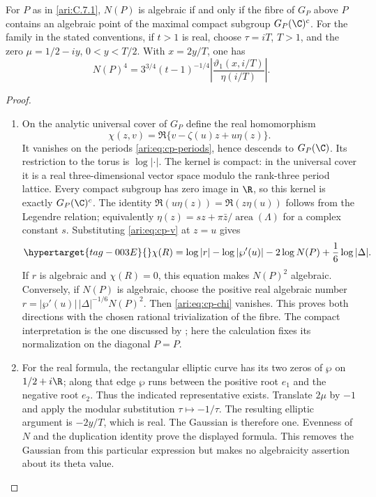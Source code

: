 \begin{proposition}\hypertarget{tag-001B}{}\label{ari:C.7.2}

For $P$ as in \cref{ari:C.7.1}, $N(P)$ is algebraic if and only
if the fibre of $G_P$ above $P$ contains an algebraic point of
the maximal compact subgroup $G_P(\C)^c$.
For the family in the stated conventions, if $t>1$ is real, choose
$\tau=iT$, $T>1$, and the zero $\mu=1/2-iy$, $0<y<T/2$.
With $x=2y/T$, one has
\[
 N(P)^4=3^{3/4}(t-1)^{-1/4}
       \left|\frac{\vartheta_1(x,i/T)}{\eta(i/T)}\right|.
\]
\end{proposition}


\begin{proof}
\begin{enumerate}[label=\arabic*.,leftmargin=*]
\item On the analytic universal cover of $G_P$ define the real
homomorphism
\[
 \chi(z,v)=\Re\{v-\zeta(u)z+u\eta(z)\}.
\]
It vanishes on the periods \eqref{ari:eq:cp-periods}, hence descends
to $G_P(\C)$. Its restriction to the torus is $\log|\cdot|$.
The kernel is compact: in the universal cover it is a real
three-dimensional vector space modulo the rank-three period
lattice. Every compact subgroup has zero image in $\R$, so
this kernel is exactly $G_P(\C)^c$.
The identity
$\Re(u\eta(z))=\Re(z\eta(u))$ follows from the Legendre relation;
equivalently $\eta(z)=sz+\pi\bar z/\operatorname{area}(\Lambda)$
for a complex constant $s$. Substituting
\eqref{ari:eq:cp-v} at $z=u$ gives
\begin{equation}\hypertarget{tag-003E}{}\label{ari:eq:cp-chi}
 \chi(R)=\log|r|-\log|\wp'(u)|
            -2\log N(P)+\frac16\log|\Delta|.
\end{equation}
If $r$ is algebraic and $\chi(R)=0$, this equation makes
$N(P)^2$ algebraic. Conversely, if $N(P)$ is algebraic,
choose the positive real algebraic number
$r=|\wp'(u)|\,|\Delta|^{-1/6}N(P)^2$.
Then \eqref{ari:eq:cp-chi} vanishes. This proves both directions
with the chosen rational trivialization of the fibre.
The compact interpretation is the one discussed by
\citet[PDF slides~5--8]{bertrand2017}; here the calculation fixes
its normalization on the diagonal $P=P$.

\item For the real formula, the rectangular elliptic curve has its
two zeros of $\wp$ on $1/2+i\R$; along that edge $\wp$ runs
between the positive root $e_1$ and the negative root $e_2$.
Thus the indicated representative exists. Translate $2\mu$
by $-1$ and apply the modular substitution $\tau\mapsto-1/\tau$.
The resulting elliptic argument is $-2y/T$, which is real.
The Gaussian is therefore one. Evenness of $N$ and the
duplication identity prove the displayed formula. This removes
the Gaussian from this particular expression but makes no
algebraicity assertion about its theta value.
\end{enumerate}
\end{proof}
